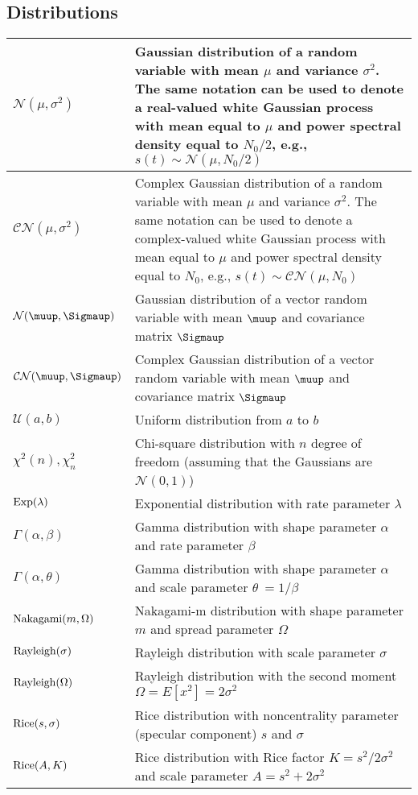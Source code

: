 \documentclass{article}
\begin{document}
\subsection{Distributions}
\begin{xltabular}{\textwidth}{XX}
    \(\mathcal{N}(\mu, \sigma^2)\) & Gaussian distribution of a random variable with mean \(\mu\) and variance \(\sigma^{2}\). The same notation can be used to denote a real-valued white Gaussian process with mean equal to \(\mu\) and power spectral density equal to \(N_0/2\), e.g., \(s(t) \sim \mathcal{N}(\mu, N_0/2)\)\\ \hline
    \(\mathcal{CN}(\mu, \sigma^2)\) & Complex Gaussian distribution of a random variable with mean \(\mu\) and variance \(\sigma^{2}\). The same notation can be used to denote a complex-valued white Gaussian process with mean equal to \(\mu\) and power spectral density equal to \(N_0\), e.g., \(s(t) \sim \mathcal{CN}(\mu, N_0)\)\\ \hline
    \(\mathcal{N}(\boldsymbol{\muup}, \boldsymbol{\Sigmaup})\) & Gaussian distribution of a vector random variable with mean \(\boldsymbol{\muup}\) and covariance matrix \(\boldsymbol{\Sigmaup}\)\\ \hline
    \(\mathcal{CN}(\boldsymbol{\muup}, \boldsymbol{\Sigmaup})\) & Complex Gaussian distribution of a vector random variable with mean \(\boldsymbol{\muup}\) and covariance matrix \(\boldsymbol{\Sigmaup}\)\\ \hline
    \(\mathcal{U}(a,b)\) & Uniform distribution from \(a\) to \(b\)\\ \hline
    \(\chi^2 (n), \chi^2_n\) & Chi-square distribution with \(n\) degree of freedom (assuming that the Gaussians are \(\mathcal{N}(0,1)\))\\ \hline
    \(\textnormal{Exp}(\lambda)\) & Exponential distribution with rate parameter \(\lambda\)\\ \hline
    \(\Gamma(\alpha, \beta)\) & Gamma distribution with shape parameter \(\alpha\) and rate parameter \(\beta\)\\ \hline
    \(\Gamma(\alpha, \theta)\) & Gamma distribution with shape parameter \(\alpha\) and scale parameter \(\theta\ = 1/\beta\)\\ \hline
    \(\textnormal{Nakagami}(m, \Omega)\) & Nakagami-m distribution with shape parameter \(m\) and spread parameter \(\Omega\) \\ \hline
    \(\textnormal{Rayleigh}(\sigma)\) & Rayleigh distribution with scale parameter \(\sigma\)\\ \hline
    \(\textnormal{Rayleigh}(\Omega)\) & Rayleigh distribution with the second moment \(\Omega = E\left[ x^2 \right] = 2\sigma^2\)\\ \hline
    \(\textnormal{Rice}(s, \sigma)\) & Rice distribution with noncentrality parameter (specular component) \(s\) and \(\sigma\)\\ \hline
    \(\textnormal{Rice}(A, K)\) & Rice distribution with Rice factor \(K=s^2/2\sigma^2\) and scale parameter \(A = s^2 + 2\sigma^2\)
\end{xltabular}
\end{document}
